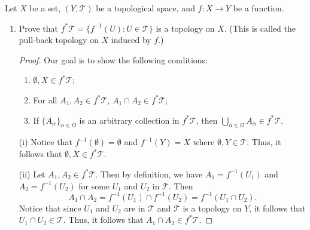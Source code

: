 \documentclass[a4paper]{article}
\begin{document}
\begin{problem}
    Let \( X  \) be a set, \( (Y,\mathcal{T}) \) be a topological space, and \( f: X \to Y  \) be a function.
    \begin{enumerate}
        \item[(i)] Prove that \( f^{*} \mathcal{T} = \{ f^{-1}(U) : U \in \mathcal{T} \}   \) is a topology on \( X  \). (This is called the pull-back topology on \( X  \) induced by \( f \).)
            \begin{proof}
            Our goal is to show the following conditions: 
            \begin{enumerate}
                \item[(i)] \( \emptyset, X \in f^{*} \mathcal{T} \);
                \item[(ii)] For all \( {A}_{1}, {A}_{2} \in f^{*} \mathcal{T} \), \( {A}_{1} \cap {A}_{2} \in f^{*} \mathcal{T} \);
                \item[(iii)] If \( \{ {A}_{\alpha} \}_{\alpha \in \Omega}  \) is an arbitrary collection in \( f^{*} \mathcal{T} \), then \( \bigcup_{ \alpha \in \Omega }^{  }  {A}_{\alpha} \in f^{*} \mathcal{T} \).
            \end{enumerate}
            (i) Notice that \( f^{-1}(\emptyset) = \emptyset \) and \( f^{-1}(Y) = X  \) where \( \emptyset, Y \in \mathcal{T} \). Thus, it follows that \( \emptyset, X \in f^{*} \mathcal{T} \).

            (ii) Let \( {A}_{1}, {A}_{2} \in f^{*} \mathcal{T} \). Then by definition, we have \( {A}_{1} = f^{-1}({U}_{1}) \) and \( {A}_{2} = f^{-1}({U}_{2})  \) for some \( {U}_{1} \) and \( {U}_{2} \) in \( \mathcal{T} \). Then
            \[  {A}_{1} \cap {A}_{2} = f^{-1}({U}_{1}) \cap f^{-1}({U}_{2}) = f^{-1}({U}_{1} \cap {U}_{2}). \]
            Notice that since \( {U}_{1} \) and \( {U}_{2}  \) are in \( \mathcal{T} \) and \( \mathcal{T}  \) is a topology on \( Y \), it follows that \( {U}_{1} \cap {U}_{2} \in \mathcal{T} \). Thus, it follows that \( {A}_{1} \cap {A}_{2} \in f^{*} \mathcal{T} \).


\end{proof}
\end{enumerate}
\end{problem}
\end{document}
